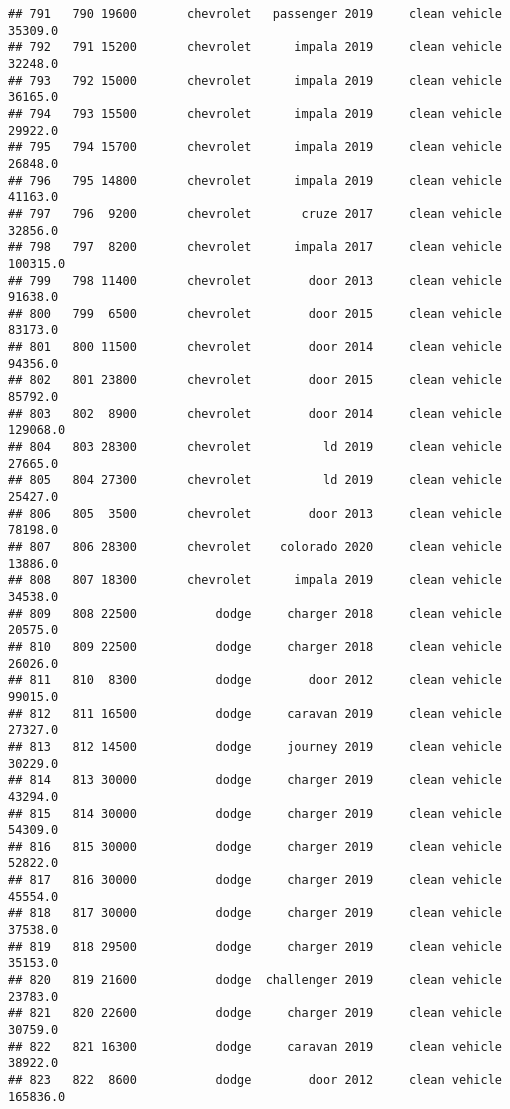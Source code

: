 \documentclass[
]{article}
\begin{document}
\begin{verbatim}
## 791   790 19600       chevrolet   passenger 2019     clean vehicle   35309.0
## 792   791 15200       chevrolet      impala 2019     clean vehicle   32248.0
## 793   792 15000       chevrolet      impala 2019     clean vehicle   36165.0
## 794   793 15500       chevrolet      impala 2019     clean vehicle   29922.0
## 795   794 15700       chevrolet      impala 2019     clean vehicle   26848.0
## 796   795 14800       chevrolet      impala 2019     clean vehicle   41163.0
## 797   796  9200       chevrolet       cruze 2017     clean vehicle   32856.0
## 798   797  8200       chevrolet      impala 2017     clean vehicle  100315.0
## 799   798 11400       chevrolet        door 2013     clean vehicle   91638.0
## 800   799  6500       chevrolet        door 2015     clean vehicle   83173.0
## 801   800 11500       chevrolet        door 2014     clean vehicle   94356.0
## 802   801 23800       chevrolet        door 2015     clean vehicle   85792.0
## 803   802  8900       chevrolet        door 2014     clean vehicle  129068.0
## 804   803 28300       chevrolet          ld 2019     clean vehicle   27665.0
## 805   804 27300       chevrolet          ld 2019     clean vehicle   25427.0
## 806   805  3500       chevrolet        door 2013     clean vehicle   78198.0
## 807   806 28300       chevrolet    colorado 2020     clean vehicle   13886.0
## 808   807 18300       chevrolet      impala 2019     clean vehicle   34538.0
## 809   808 22500           dodge     charger 2018     clean vehicle   20575.0
## 810   809 22500           dodge     charger 2018     clean vehicle   26026.0
## 811   810  8300           dodge        door 2012     clean vehicle   99015.0
## 812   811 16500           dodge     caravan 2019     clean vehicle   27327.0
## 813   812 14500           dodge     journey 2019     clean vehicle   30229.0
## 814   813 30000           dodge     charger 2019     clean vehicle   43294.0
## 815   814 30000           dodge     charger 2019     clean vehicle   54309.0
## 816   815 30000           dodge     charger 2019     clean vehicle   52822.0
## 817   816 30000           dodge     charger 2019     clean vehicle   45554.0
## 818   817 30000           dodge     charger 2019     clean vehicle   37538.0
## 819   818 29500           dodge     charger 2019     clean vehicle   35153.0
## 820   819 21600           dodge  challenger 2019     clean vehicle   23783.0
## 821   820 22600           dodge     charger 2019     clean vehicle   30759.0
## 822   821 16300           dodge     caravan 2019     clean vehicle   38922.0
## 823   822  8600           dodge        door 2012     clean vehicle  165836.0

\end{verbatim}
\end{document}
